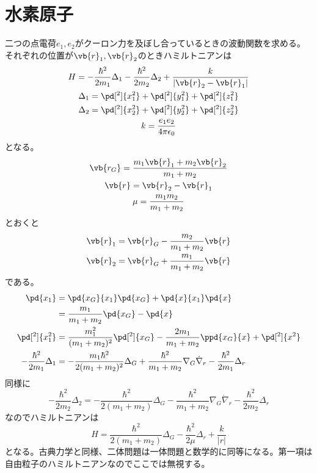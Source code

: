 
\section{水素原子}
	二つの点電荷$e_1, e_2$がクーロン力を及ぼし合っているときの波動関数を求める。それぞれの位置が$\vb{r}_1, \vb{r}_2$のときハミルトニアンは
	\begin{gather*}
		H = -\frac{\hbar^2}{2m_1}\Delta_1 -\frac{\hbar^2}{2m_2}\Delta_2 + \frac{k}{|\vb{r}_2 - \vb{r}_1|}\\
		\Delta_1 = \pd[^2]{x_1^2} + \pd[^2]{y_1^2} + \pd[^2]{z_1^2}\\
		\Delta_2 = \pd[^2]{x_2^2} + \pd[^2]{y_2^2} + \pd[^2]{z_2^2}\\
		k = \frac{e_1e_2}{4\pi\epsilon_0}
	\end{gather*}
	となる。
	\begin{gather*}
		\vb{r_G} = \frac{m_1\vb{r}_1 + m_2\vb{r}_2}{m_1 + m_2}\\
		\vb{r} = \vb{r}_2 - \vb{r}_1\\
		\mu = \frac{m_1m_2}{m_1 + m_2}
	\end{gather*}
	とおくと
	\begin{gather*}
		\vb{r}_1 = \vb{r}_G - \frac{m_2}{m_1 + m_2}\vb{r}\\
		\vb{r}_2 = \vb{r}_G + \frac{m_1}{m_1 + m_2}\vb{r}\\
	\end{gather*}
	である。
	\begin{align*}
		\pd{x_1}
		&= \pd{x_G}{x_1}\pd{x_G} + \pd{x}{x_1}\pd{x}\\
		&= \frac{m_1}{m_1 + m_2}\pd{x_G} - \pd{x}\\
		\pd[^2]{x_1^2}
		&= \frac{m_1^2}{(m_1 + m_2)^2}\pd[^2]{x_G} - \frac{2m_1}{m_1 + m_2}\ppd{x_G}{x} + \pd[^2]{x^2}\\
		-\frac{\hbar^2}{2m_1}\Delta_1
		&= -\frac{m_1\hbar^2}{2(m_1 + m_2)^2}\Delta_G + \frac{\hbar^2}{m_1 + m_2}\nabla_G\dot\nabla_r - \frac{\hbar^2}{2m_1}\Delta_r\\
	\end{align*}
	同様に
		\[-\frac{\hbar^2}{2m_2}\Delta_2 = -\frac{\hbar^2}{2(m_1 + m_2)}\Delta_G - \frac{\hbar^2}{m_1 + m_2}\nabla_G\dot\nabla_r -\frac{\hbar^2}{2m_2}\Delta_r\]
	なのでハミルトニアンは
		\[H = \frac{\hbar^2}{2(m_1 + m_2)}\Delta_G - \frac{\hbar^2}{2\mu}\Delta_r + \frac{k}{|r|}\]
	となる。古典力学と同様、二体問題は一体問題と数学的に同等になる。第一項は自由粒子のハミルトニアンなのでここでは無視する。

